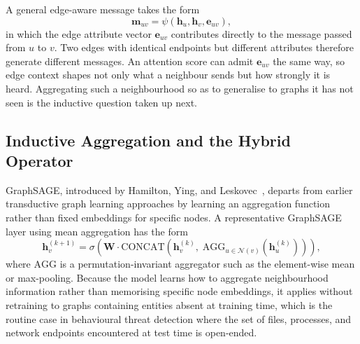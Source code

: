\documentclass[%
    BCOR=10mm,
    DIV=13,
    toc=bibliography,
    toc=listof,
    oneside,
    12pt,
]{scrbook}
\begin{document}
A general edge-aware message takes the form \begin{equation} \mathbf{m}_{uv} =
\psi\!\left( \mathbf{h}_u, \mathbf{h}_v, \mathbf{e}_{uv} \right),
\label{eq:edge_message} \end{equation} in which the edge attribute vector
$\mathbf{e}_{uv}$ contributes directly to the message passed from $u$ to $v$.
Two edges with identical endpoints but different attributes therefore generate
different messages. An attention score can admit $\mathbf{e}_{uv}$ the same
way, so edge context shapes not only what a neighbour sends but how strongly
it is heard. Aggregating such a neighbourhood so as to generalise to graphs it
has not seen is the inductive question taken up next.

\subsection{Inductive Aggregation and the Hybrid Operator}
\label{subsec:hybrid}

GraphSAGE, introduced by Hamilton, Ying, and
Leskovec~\cite{hamilton2017graphsage}, departs from earlier transductive
graph learning approaches by learning an aggregation function rather than
fixed embeddings for specific nodes. A representative GraphSAGE layer using
mean aggregation has the form
\begin{equation}
  \mathbf{h}_v^{(k+1)} = \sigma\!\left(
    \mathbf{W} \cdot \mathrm{CONCAT}\!\left(
      \mathbf{h}_v^{(k)},\;
      \mathrm{AGG}_{u \in \mathcal{N}(v)}\!\left( \mathbf{h}_u^{(k)} \right)
    \right)
  \right),
  \label{eq:graphsage}
\end{equation}
where $\mathrm{AGG}$ is a permutation-invariant aggregator such as the
element-wise mean or max-pooling. Because the model learns how to aggregate
neighbourhood information rather than memorising specific node embeddings, it
applies without retraining to graphs containing entities absent at training
time, which is the routine case in behavioural threat detection where the set
of files, processes, and network endpoints encountered at test time is
open-ended.
\end{document}
